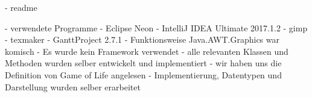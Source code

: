 \documentclass[12pt]{article}
\theoremstyle{plain}
\begin{document}
\begin{linenumbers}
- readme

- verwendete Programme
	- Eclipse Neon
	- IntelliJ IDEA Ultimate 2017.1.2
	- gimp
	- texmaker
	- GanttProject 2.7.1
- Funktionsweise Java.AWT.Graphics war komisch
- Es wurde kein Framework verwendet
	- alle relevanten Klassen und Methoden wurden selber entwickelt und implementiert
- wir haben uns die Definition von Game of Life angelesen
	- Implementierung, Datentypen und Darstellung wurden selber erarbeitet


\end{linenumbers}
\end{document}
